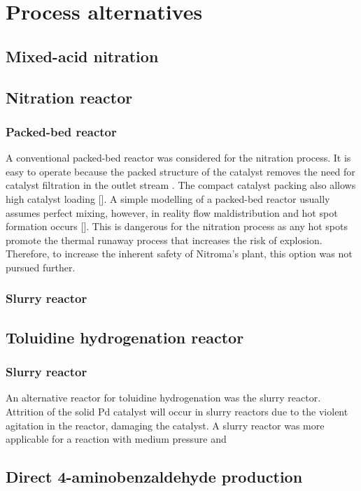 \section{Process alternatives}
\label{app:alternatives}

\subsection{Mixed-acid nitration}
\label{mixed}

\subsection{Nitration reactor}
\label{nitrationreactor}
\subsubsection{Packed-bed reactor}
A conventional packed-bed reactor was considered for the nitration process. It is easy to operate because the packed structure of the catalyst removes the need for catalyst filtration in the outlet stream . The compact catalyst packing also allows high catalyst loading []. A simple modelling of a packed-bed reactor usually assumes perfect mixing, however, in reality flow maldistribution and hot spot formation occurs []. This is dangerous for the nitration process as any hot spots promote the thermal runaway process that increases the risk of explosion. Therefore, to increase the inherent safety of Nitroma's plant, this option was not pursued further.

\subsubsection{Slurry reactor}

\subsection{Toluidine hydrogenation reactor}
\label{toluidine}
\subsubsection{Slurry reactor}
An alternative reactor for toluidine hydrogenation was the slurry reactor. Attrition of the solid Pd catalyst will occur in slurry reactors due to the violent agitation in the reactor, damaging the catalyst. A slurry reactor was more applicable for a reaction with medium pressure and 


\subsection{Direct 4-aminobenzaldehyde production}
\label{direct}